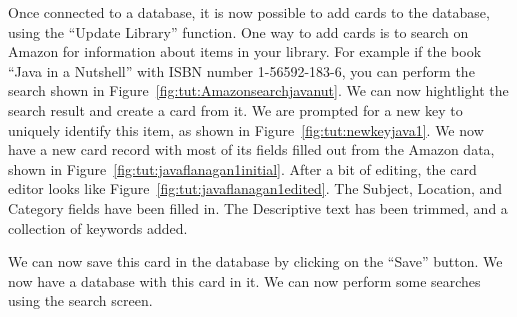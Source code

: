 Once connected to a database, it is now possible to add cards to the
database, using the ``Update Library'' function. One way to add cards
is to search on Amazon for information about items in your library. For
example if the book ``Java in a Nutshell'' with ISBN number
1-56592-183-6, you can perform the search shown in
Figure~\ref{fig:tut:Amazonsearchjavanut}. We can now hightlight the
search result and create a card from it.  We are prompted for a new key
to uniquely identify this item, as shown in
Figure~\ref{fig:tut:newkeyjava1}. We now have a new card record with
most of its fields filled out from the Amazon data, shown in
Figure~\ref{fig:tut:javaflanagan1initial}.  After a bit of editing, the
card editor looks like Figure~\ref{fig:tut:javaflanagan1edited}.  The
Subject, Location, and Category fields have been filled in.  The
Descriptive text has been trimmed, and a collection of keywords added.

We can now save this card in the database by clicking on the ``Save''
button. We now have a database with this card in it.  We can now perform
some searches using the search screen.

